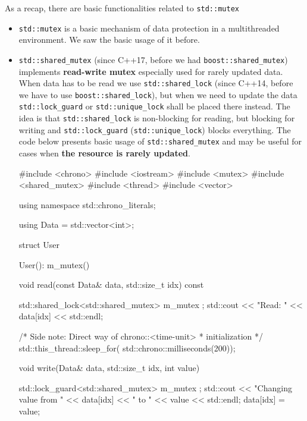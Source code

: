 \documentclass[../main]{subfiles}
\begin{document}
    As a recap, there are basic functionalities related to \texttt{std::mutex}
\begin{itemize}
    \item \texttt{std::mutex} is a basic mechanism of data protection in a multithreaded environment. We saw the basic usage of it before.
    \item \texttt{std::shared\_mutex} (since C++17, before we had \texttt{boost::shared\_mutex}) implements \textbf {read-write mutex} especially used
    for rarely updated data. When data has to be read we use \texttt{std::shared\_lock} (since C++14, before we have to use \texttt{boost::shared\_lock}), but when
    we need to update the data \texttt{std::lock\_guard} or \texttt{std::unique\_lock} shall be placed there instead. The idea is that\linebreak
    \texttt{std::shared\_lock} is non-blocking for reading, but blocking for writing and \texttt{std::lock\_guard} (\texttt{std::unique\_lock}) blocks everything.\newline
        The code below presents basic usage of \texttt{std::shared\_mutex} and may be useful for cases when \textbf{the resource is rarely updated}.
    \begin{Code}
        #include <chrono>
        #include <iostream>
        #include <mutex>
        #include <shared_mutex>
        #include <thread>
        #include <vector>

        using namespace std::chrono_literals;

        using Data = std::vector<int>;

        struct User
        {
            User(): m_mutex()
            {
            }

            void read(const Data& data, std::size_t idx) const
            {
                std::shared_lock<std::shared_mutex> { m_mutex };
                std::cout << "Read: " << data[idx] << std::endl;

                /* Side note: Direct way of chrono::<time-unit>
                 * initialization
                 */
                std::this_thread::sleep_for(
                    std::chrono::milliseconds(200));
            }

            void write(Data& data, std::size_t idx, int value)
            {
                std::lock_guard<std::shared_mutex> { m_mutex };
                std::cout << "Changing value from " << data[idx]
                          << " to " << value << std::endl;
                data[idx] = value;

}}
\end{Code}
\end{itemize}
\end{document}
